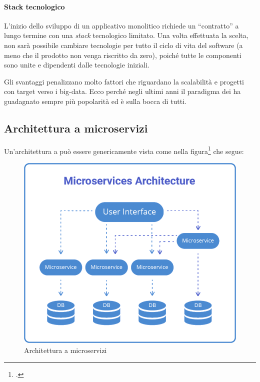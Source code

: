 \paragraph*{Stack tecnologico} L'inizio dello sviluppo di un applicativo monolitico richiede un ``contratto'' a lungo termine con una \textit{stack} tecnologico limitato. Una volta effettuata la scelta, non sarà possibile cambiare tecnologie per tutto il ciclo di vita del software (a meno che il prodotto non venga riscritto da zero), poiché tutte le componenti sono unite e dipendenti dalle tecnologie iniziali.

Gli svantaggi penalizzano molto fattori che riguardano la scalabilità
e progetti con target verso i \gls{big-data}.
Ecco perché negli ultimi anni il paradigma dei  ha guadagnato
sempre più popolarità ed è sulla bocca di tutti.

\clearpage


\subsection{Architettura a microservizi}

Un'architettura a  può essere genericamente vista come
nella figura\footcite{site:microservices-architecture} che segue:

\begin{figure}[H]
	\centering
	\includegraphics[width=\textwidth]{immagini/microservices_architecture.png} %
	\caption[Architettura a microservizi]{Architettura  a microservizi}
	\label{fig:microservices-arch}
\end{figure}


